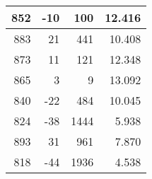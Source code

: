 \begin{longtable}{|r|r|r|r|}
	852                                                                                             & -10                                               & 100                                                  & 12.416                                                                                         \\ \hline
	883                                                                                             & 21                                                & 441                                                  & 10.408                                                                                         \\ \hline
	873                                                                                             & 11                                                & 121                                                  & 12.348                                                                                         \\ \hline
	865                                                                                             & 3                                                 & 9                                                    & 13.092                                                                                         \\ \hline
	840                                                                                             & -22                                               & 484                                                  & 10.045                                                                                         \\ \hline
	824                                                                                             & -38                                               & 1444                                                 & 5.938                                                                                          \\ \hline
	893                                                                                             & 31                                                & 961                                                  & 7.870                                                                                          \\ \hline
	818                                                                                             & -44                                               & 1936                                                 & 4.538                                                                                          \\ \hline

\end{longtable}
